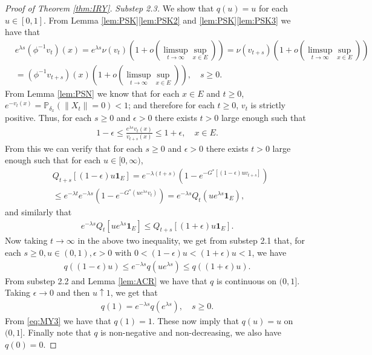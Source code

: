 \documentclass[12pt,a4paper]{amsart}
\numberwithin{equation}{section}
\theoremstyle{plain}
\theoremstyle{definition}
\begin{document}
\begin{proof}[Proof of Theorem \ref{thm:IRY}]
\emph{Substep 2.3.}
We show that $q(u) = u$ for each $u \in [0,1]$.
From Lemma \ref{lem:PSK}\eqref{lem:PSK2} and \ref{lem:PSK}\eqref{lem:PSK3} we have that
\begin{align}
	& e^{\lambda s}(\phi^{-1}v_t)(x) 
  = e^{\lambda s}\nu(v_{t})(1+o(\limsup_{t\to \infty}\sup_{x\in E})) 
   =\nu(v_{t+s}) (1+o(\limsup_{t\to \infty}\sup_{x\in E})) \\
  & = (\phi^{-1}v_{t+s})(x) (1+o(\limsup_{t\to \infty} \sup_{x\in E}))
    , \quad s\geq 0.
\end{align}
From Lemma \ref{lem:PSN} we know that for each $x\in E$ and $t\geq 0$, $e^{-v_t(x)} = \mathbb P_{\delta_x}(\|X_t\| = 0) < 1$; and therefore for each $t\geq 0$, $v_t$ is strictly positive.
Thus, for each $s\geq 0$ and $\epsilon >0$ there exists $t>0$ large enough such that
\begin{align}
	1-\epsilon\leq \frac{e^{\lambda s}v_t(x)}{v_{t+s}(x)} 
  \leq 1+\epsilon,
  \quad x\in E.
\end{align}
From this we can verify that for each $s\geq 0$ and $\epsilon >0$ there exists $t>0$ large enough such that for each $u \in [0,\infty)$,
\begin{align}
	& Q_{t+s}[ (1-\epsilon)u\mathbf 1_E ]
   = e^{-\lambda(t+s)}( 1-e^{-G^*[(1-\epsilon)uv_{t+s}]} ) \\
  & \leq e^{-\lambda t} e^{-\lambda s}( 1- e^{-G^*(ue^{\lambda s}v_t)} )
    = e^{-\lambda s}Q_t(ue^{\lambda s} \mathbf 1_E),
\end{align}
and similarly that
\begin{align}
	e^{-\lambda s}Q_t[ue^{\lambda s}\mathbf 1_E] 
  \leq Q_{t+s}[(1+\epsilon)u\mathbf 1_E].
\end{align}
Now taking $t\to \infty$ in the above two inequality, we get from substep 2.1 that, for each $s\geq 0, u\in (0,1), \epsilon > 0$ with $0 < (1 - \epsilon) u < (1+\epsilon)u < 1$, we have
 \begin{align}
   q((1-\epsilon)u)\leq e^{-\lambda s}q(u e^{\lambda s}) \leq q((1+\epsilon)u).
 \end{align}
 From substep 2.2 and Lemma \ref{lem:ACR} we have that $q$ is continuous on $(0,1]$. 
Taking $\epsilon \to 0$ and then $u \uparrow 1$, we get that 
\begin{align}
	q(1) 
  = e^{- \lambda s} q(e^{\lambda s}), 
  \quad s \geq 0. 
\end{align} 
From \eqref{eq:MY3} we have that $q(1) = 1$.
These now imply that $q(u) = u$ on $(0,1]$.
Finally note that $q$ is non-negative and non-decreasing, we also have $q(0) = 0$.


\end{proof}
\end{document}
